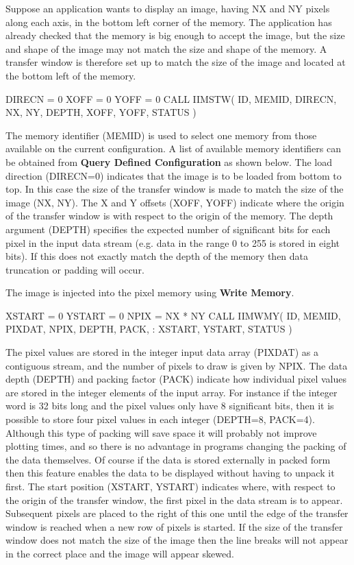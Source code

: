 \documentclass[11pt,nolof]{starlink}
\begin{document}
Suppose an application wants to display an image, having NX and NY
pixels along each axis, in the bottom left corner of the memory.
The application has already checked that the memory is big
enough to accept the image, but the size and shape of the image may
not match the size and shape of the memory. A transfer window is
therefore set up to match the size of the image and located at the
bottom left of the memory.
\begin{small}
\begin{terminalv}
      DIRECN = 0
      XOFF = 0
      YOFF = 0
      CALL IIMSTW( ID, MEMID, DIRECN, NX, NY, DEPTH, XOFF, YOFF, STATUS )
\end{terminalv}
\end{small}
The memory identifier (MEMID) is used to select one memory from those
available on the current configuration. A list of available memory
identifiers can be obtained from \textbf{Query Defined Configuration}
as shown below. The load direction (DIRECN=0) indicates that the image
is to be loaded from bottom to top. In this case the size of the transfer
window is made to match the size of the image (NX, NY). The X and Y
offsets (XOFF, YOFF) indicate where the origin of the transfer window
is with respect to the origin of the memory. The depth
argument (DEPTH) specifies the expected number of significant bits
for each pixel in the input data stream (e.g. data in the range 0 to
255 is stored in eight bits). If this does not exactly match the
depth of the memory then data truncation or padding will occur.

The image is injected into the pixel memory using \textbf{Write Memory}.
\begin{small}
\begin{terminalv}
      XSTART = 0
      YSTART = 0
      NPIX = NX * NY
      CALL IIMWMY( ID, MEMID, PIXDAT, NPIX, DEPTH, PACK,
     :             XSTART, YSTART, STATUS )
\end{terminalv}
\end{small}
The pixel values are stored in the integer input data array (PIXDAT)
as a contiguous stream, and the number of pixels to draw is given by
NPIX. The data depth (DEPTH) and packing factor (PACK) indicate how
individual pixel values are stored in the integer elements of the
input array. For instance if the integer word is 32 bits long and
the pixel values only have 8 significant bits, then it is possible
to store four pixel values in each integer (DEPTH=8, PACK=4).
Although this type of packing will save space it will probably not
improve plotting times, and so there is no advantage in programs
changing the packing of the data themselves. Of course if the data
is stored externally in packed form then this feature enables the data
to be displayed without having to unpack it first. The start position
(XSTART, YSTART) indicates where, with respect to the origin of the
transfer window, the first pixel in the data stream is to appear.
Subsequent pixels are placed to the right of this one until the edge
of the transfer window is reached when a new row of pixels is started.
If the size of the transfer window does not match the size of the
image then the line breaks will not appear in the correct place and
the image will appear skewed.
\end{document}

